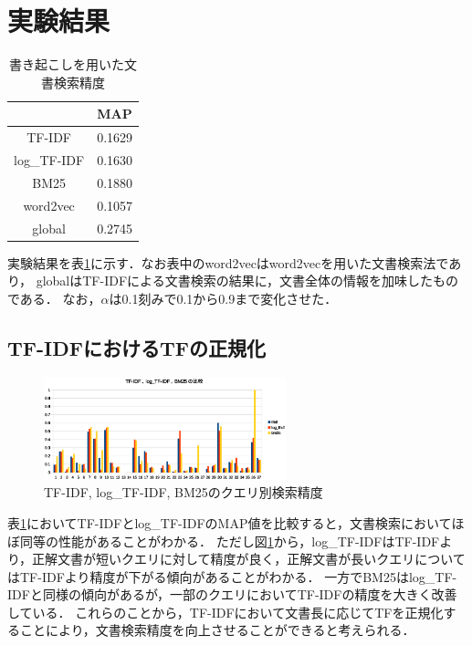 \section{実験結果}
\begin{table}[htbp]
    \begin{center}
        \caption{書き起こしを用いた文書検索精度}
        \begin{tabular}{|c|l|}
            \hline
            & MAP \\ \hline
            TF-IDF & 0.1629 \\ \hline \hline
            log\_TF-IDF & 0.1630 \\ \hline
            BM25 & 0.1880 \\ \hline
            word2vec & 0.1057 \\ \hline
            global & 0.2745 \\ \hline
        \end{tabular}
        \label{t_text}
    \end{center}
\end{table}
実験結果を表\ref{t_text}に示す．なお表中のword2vecはword2vecを用いた文書検索法であり，
globalはTF-IDFによる文書検索の結果に，文書全体の情報を加味したものである．
なお，$\alpha$は0.1刻みで0.1から0.9まで変化させた．

\subsection{TF-IDFにおけるTFの正規化}
\begin{figure}
    \centering
    \includegraphics[width=7cm]{./graph/TFIDF_log_BM25.eps}
    \caption{TF-IDF, log\_TF-IDF, BM25のクエリ別検索精度}
    \label{fig_tf_log_BM25}
\end{figure}
表\ref{t_text}においてTF-IDFとlog\_TF-IDFのMAP値を比較すると，文書検索においてほぼ同等の性能があることがわかる．
ただし図\ref{fig_tf_log_BM25}から，log\_TF-IDFはTF-IDFより，正解文書が短いクエリに対して精度が良く，正解文書が長いクエリについてはTF-IDFより精度が下がる傾向があることがわかる．
一方でBM25はlog\_TF-IDFと同様の傾向があるが，一部のクエリにおいてTF-IDFの精度を大きく改善している．
これらのことから，TF-IDFにおいて文書長に応じてTFを正規化することにより，文書検索精度を向上させることができると考えられる．

